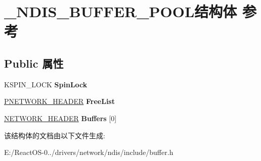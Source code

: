 \hypertarget{struct___n_d_i_s___b_u_f_f_e_r___p_o_o_l}{}\section{\+\_\+\+N\+D\+I\+S\+\_\+\+B\+U\+F\+F\+E\+R\+\_\+\+P\+O\+O\+L结构体 参考}
\label{struct___n_d_i_s___b_u_f_f_e_r___p_o_o_l}
\subsection*{Public 属性}
\begin{DoxyCompactItemize}
\item 
\mbox{\label{struct___n_d_i_s___b_u_f_f_e_r___p_o_o_l_a1e9d2bfeb01303ef61b66d4ef34de386}} 
K\+S\+P\+I\+N\+\_\+\+L\+O\+CK {\bfseries Spin\+Lock}
\item 
\mbox{\label{struct___n_d_i_s___b_u_f_f_e_r___p_o_o_l_a2475f81c3430d4d013299296d0c3402b}} 
\hyperlink{struct___n_e_t_w_o_r_k___h_e_a_d_e_r}{P\+N\+E\+T\+W\+O\+R\+K\+\_\+\+H\+E\+A\+D\+ER} {\bfseries Free\+List}
\item 
\mbox{\label{struct___n_d_i_s___b_u_f_f_e_r___p_o_o_l_af298081abf3087bc1b49fd369729b3d2}} 
\hyperlink{struct___n_e_t_w_o_r_k___h_e_a_d_e_r}{N\+E\+T\+W\+O\+R\+K\+\_\+\+H\+E\+A\+D\+ER} {\bfseries Buffers} \mbox{[}0\mbox{]}
\end{DoxyCompactItemize}


该结构体的文档由以下文件生成\+:\begin{DoxyCompactItemize}
\item 
E\+:/\+React\+O\+S-\/0../drivers/network/ndis/include/buffer.\+h\end{DoxyCompactItemize}
